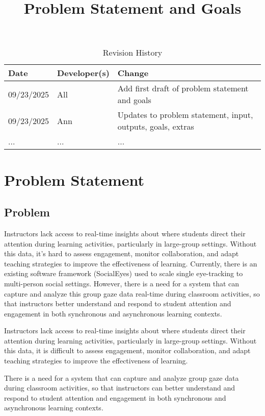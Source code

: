 \documentclass{article}
\title{Problem Statement and Goals\\\progname}
\author{\authname}
\date{}
\begin{document}
\maketitle

\begin{table}[hp]
\caption{Revision History} \label{TblRevisionHistory}
\begin{tabularx}{\textwidth}{llX}
\toprule
\textbf{Date} & \textbf{Developer(s)} & \textbf{Change}\\
\midrule
09/23/2025 & All & Add first draft of problem statement and goals\\
09/23/2025 & Ann & Updates to problem statement, input, outputs, goals, extras\\
... & ... & ...\\
\bottomrule
\end{tabularx}
\end{table}

\section{Problem Statement}
\subsection{Problem}
Instructors lack access to real-time insights about where students direct their attention during learning activities, particularly in large-group settings. Without this data, it's hard to assess engagement, monitor collaboration, and adapt teaching strategies to improve the effectiveness of learning. Currently, there is an existing software framework (SocialEyes) used to scale single eye-tracking to multi-person social settings. However, there is a need for a system that can capture and analyze this group gaze data real-time during classroom activities, so that instructors better understand and respond to student attention and engagement in both synchronous and asynchronous learning contexts. 


Instructors lack access to real-time insights about where students direct their 
attention during learning activities, particularly in large-group settings. Without 
this data, it is difficult to assess engagement, monitor collaboration, and adapt 
teaching strategies to improve the effectiveness of learning. 

There is a need for a system that can capture and analyze group gaze data during 
classroom activities, so that instructors can better understand and respond to 
student attention and engagement in both synchronous and asynchronous 
learning contexts.
\end{document}
